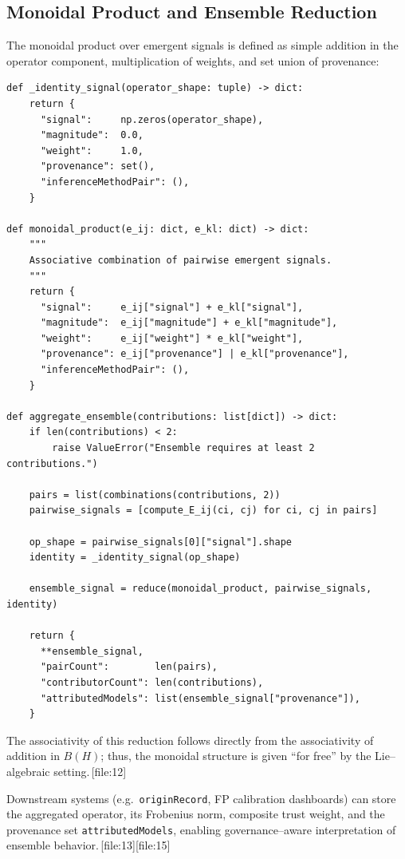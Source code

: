 \documentclass[11pt]{article}
\begin{document}
\subsection{Monoidal Product and Ensemble Reduction}

The monoidal product over emergent signals is defined as simple addition in
the operator component, multiplication of weights, and set union of
provenance:

\begin{lstlisting}[language=Python3,caption={Monoidal product and ensemble aggregation.}]
def _identity_signal(operator_shape: tuple) -> dict:
    return {
      "signal":     np.zeros(operator_shape),
      "magnitude":  0.0,
      "weight":     1.0,
      "provenance": set(),
      "inferenceMethodPair": (),
    }

def monoidal_product(e_ij: dict, e_kl: dict) -> dict:
    """
    Associative combination of pairwise emergent signals.
    """
    return {
      "signal":     e_ij["signal"] + e_kl["signal"],
      "magnitude":  e_ij["magnitude"] + e_kl["magnitude"],
      "weight":     e_ij["weight"] * e_kl["weight"],
      "provenance": e_ij["provenance"] | e_kl["provenance"],
      "inferenceMethodPair": (),
    }

def aggregate_ensemble(contributions: list[dict]) -> dict:
    if len(contributions) < 2:
        raise ValueError("Ensemble requires at least 2 contributions.")

    pairs = list(combinations(contributions, 2))
    pairwise_signals = [compute_E_ij(ci, cj) for ci, cj in pairs]

    op_shape = pairwise_signals[0]["signal"].shape
    identity = _identity_signal(op_shape)

    ensemble_signal = reduce(monoidal_product, pairwise_signals, identity)

    return {
      **ensemble_signal,
      "pairCount":        len(pairs),
      "contributorCount": len(contributions),
      "attributedModels": list(ensemble_signal["provenance"]),
    }
\end{lstlisting}

The associativity of this reduction follows directly from the associativity of
addition in \(B(H)\); thus, the monoidal structure is given ``for free'' by
the Lie--algebraic setting.\,[file:12]

Downstream systems (e.g.\ \texttt{originRecord}, FP calibration dashboards)
can store the aggregated operator, its Frobenius norm, composite trust weight,
and the provenance set \texttt{attributedModels}, enabling governance--aware
interpretation of ensemble behavior.\,[file:13][file:15]
\end{document}
